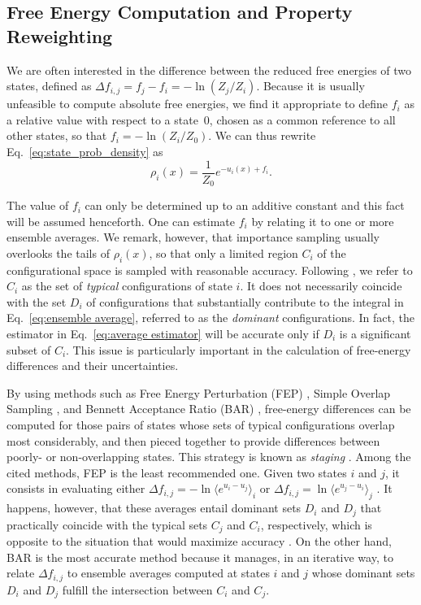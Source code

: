 \documentclass[journal=jctcce,manuscript=article]{achemso}
\begin{document}
\subsection{Free Energy Computation and Property Reweighting}
\label{sec:fep and reweighting}

We are often interested in the difference between the reduced free energies of two states, defined as $\Delta f_{i,j} = f_j - f_i = - \ln (Z_j/Z_i)$. Because it is usually unfeasible to compute absolute free energies, we find it appropriate to define $f_i$ as a relative value with respect to a state~$0$, chosen as a common reference to all other states, so that $f_i = -\ln (Z_i/Z_0)$. We can thus rewrite Eq.~\eqref{eq:state_prob_density} as
\begin{equation}
\label{eq:state_prob_density_Z0}
\rho_i(x) = \frac{1}{Z_0} e^{-u_i(x)+ f_i}.
\end{equation}

The value of $f_i$ can only be determined up to an additive constant and this fact will be assumed henceforth. One can estimate $f_i$ by relating it to one or more ensemble averages. We remark, however, that importance sampling usually overlooks the tails of $\rho_i(x)$, so that only a limited region $C_i$ of the configurational space is sampled with reasonable accuracy. Following \citeauthor{Jarzynski_2006} \cite{Jarzynski_2006}, we refer to $C_i$ as the set of \textit{typical} configurations of state $i$. It does not necessarily coincide with the set $D_i$ of configurations that substantially contribute to the integral in Eq.~\eqref{eq:ensemble average}, referred to as the \textit{dominant} configurations. In fact, the estimator in Eq.~\eqref{eq:average estimator} will be accurate only if $D_i$ is a significant subset of $C_i$. This issue is particularly important in the calculation of free-energy differences and their uncertainties.

By using methods such as Free Energy Perturbation (FEP) \cite{Zwanzig_1954}, Simple Overlap Sampling \cite{Lee_1980, Lu_2003}, and Bennett Acceptance Ratio (BAR) \cite{Bennett_1976}, free-energy differences can be computed for those pairs of states whose sets of typical configurations overlap most considerably, and then pieced together to provide differences between poorly- or non-overlapping states. This strategy is known as \textit{staging} \cite{Kofke_1998}. Among the cited methods, FEP is the least recommended one. Given two states $i$ and $j$, it consists in evaluating either $\Delta f_{i,j} = -\ln \langle e^{u_i - u_j} \rangle_i$ or $\Delta f_{i,j} = \ln \langle e^{u_j - u_i} \rangle_j$ \cite{Zwanzig_1954}. It happens, however, that these averages entail dominant sets $D_i$ and $D_j$ that practically coincide with the typical sets $C_j$ and $C_i$, respectively, which is opposite to the situation that would maximize accuracy \cite{Jarzynski_2006}. On the other hand, BAR is the most accurate method because it manages, in an iterative way, to relate $\Delta f_{i,j}$ to ensemble averages computed at states $i$ and $j$ whose dominant sets $D_i$ and $D_j$ fulfill the intersection between $C_i$ and $C_j$.
\end{document}
